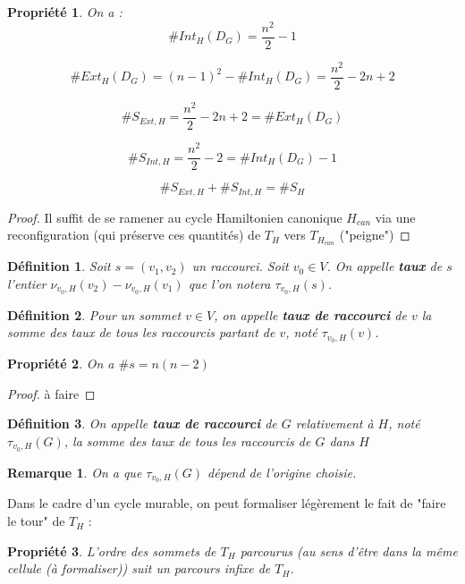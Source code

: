 \documentclass[french,a4paper]{article}
\newtheorem{definition}{Définition}[section]
\newtheorem{property}{Propriété}[section]
\newtheorem{proof}{Preuve}[section]
\newtheorem{remark}{Remarque}[section]
\begin{document}
\begin{property}
On a :
\[
\#Int_{H}(D_G)=\frac{n^{2}}{2}-1
\]

\[
\#Ext_{H}(D_G)=(n-1)^{2}-\#Int_{H}(D_G)=\frac{n^{2}}{2}-2n+2
\]

\[
\#S_{Ext,H}=\frac{n^{2}}{2}-2n+2=\#Ext_{H}(D_G)
\]

\[
\#S_{Int,H}=\frac{n^{2}}{2}-2=\#Int_{H}(D_G)-1
\]

\[
\#S_{Ext,H}+\#S_{Int,H}=\#S_{H}
\]
\end{property}

\begin{proof}
Il suffit de se ramener au cycle Hamiltonien canonique $H_{can}$ via une reconfiguration (qui préserve ces quantités) de $T_H$ vers $T_{H_{can}}$ ("peigne")
\end{proof}

\begin{definition}
Soit $s=(v_1,v_2)$ un raccourci. Soit $v_0 \in V$.
On appelle \textbf{taux} de $s$ l'entier $\nu_{v_0,H}(v_2)-\nu_{v_0,H}(v_1)$ que l'on notera $\tau_{v_0,H}(s)$.
\end{definition}

\begin{definition}
Pour un sommet $v \in V$, on appelle \textbf{taux de raccourci} de $v$ la somme des taux de tous les raccourcis partant de $v$, noté $\tau_{v_0,H}(v)$. 
\end{definition}

\begin{property}
On a $\#s=n(n-2)$
\end{property}

\begin{proof}
à faire
\end{proof}

\begin{definition}
On appelle \textbf{taux de raccourci} de $G$ relativement à $H$, noté $\tau_{v_0,H}(G)$, la somme des taux de tous les raccourcis de $G$ dans $H$
\end{definition}

\begin{remark}
On a que $\tau_{v_0,H}(G)$ dépend de l'origine choisie. 
\end{remark}



Dans le cadre d'un cycle murable, on peut formaliser légèrement le fait de "faire le tour" de $T_H$ :

\begin{property}
L'ordre des sommets de $T_H$ parcourus (au sens d'être dans la même cellule (à formaliser)) suit un parcours infixe de $T_H$.
\end{property}
\end{document}
